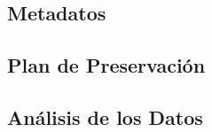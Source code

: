 \documentclass[12pt, spanish]{article}
\begin{document}
\subsection{Metadatos}

\subsection{Plan de Preservación}

\subsection{Análisis de los Datos}




































\end{document}
